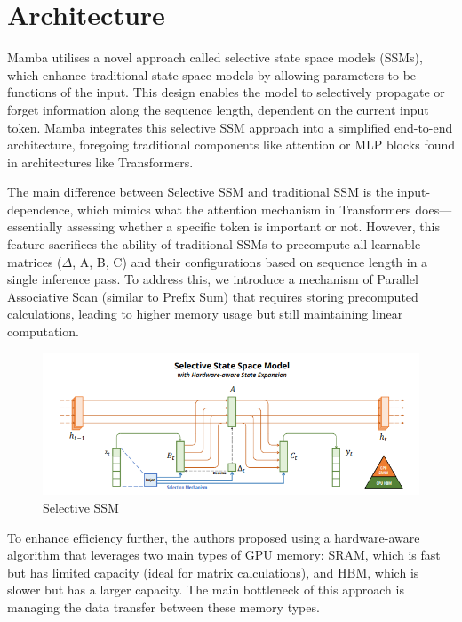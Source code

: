 \documentclass[conference]{IEEEtran}
\begin{document}
\section{Architecture}
Mamba utilises a novel approach called selective state space models (SSMs), which enhance traditional state space models by allowing
parameters to be functions of the input. This design enables the model to selectively propagate or forget information along the sequence length,
dependent on the current input token. Mamba integrates this selective SSM approach into a simplified end-to-end architecture, foregoing traditional components
like attention or MLP blocks found in architectures like Transformers.

The main difference between Selective SSM and traditional SSM is the input-dependence, which mimics what the attention mechanism in Transformers
does—essentially assessing whether a specific token is important or not. However, this feature sacrifices the ability of traditional SSMs
to precompute all learnable matrices ($\Delta$, A, B, C) and their configurations based on sequence length in a single inference pass.
To address this, we introduce a mechanism of Parallel Associative Scan (similar to Prefix Sum) that requires storing precomputed calculations,
leading to higher memory usage but still maintaining linear computation.

\begin{figure}[!htbp]
    \centering \includegraphics[width=\linewidth]{../assets/SelectiveSSM.png}
    \caption{Selective SSM \cite{mamba}}
    \label{fig:ssm}
\end{figure}

To enhance efficiency further, the authors proposed using a hardware-aware algorithm that leverages two main types of GPU memory:
SRAM, which is fast but has limited capacity (ideal for matrix calculations), and HBM, which is slower but has a larger capacity.
The main bottleneck of this approach is managing the data transfer between these memory types.
\end{document}
